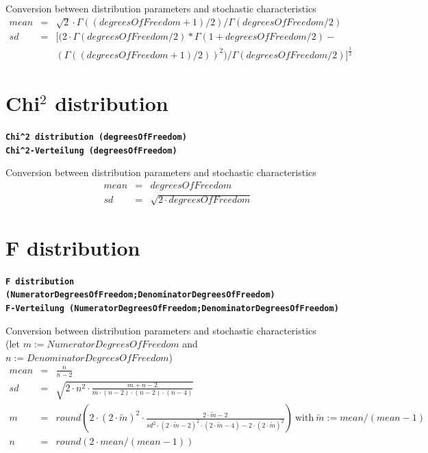 \documentclass{svmono}
\def\cm#1{\textbf{\texttt{#1}}}
\begin{document}
Conversion between distribution parameters and stochastic characteristics
\begin{eqnarray*}
mean&=&\sqrt{2}\cdot\Gamma((degreesOfFreedom+1)/2)/\Gamma(degreesOfFreedom/2)\\
sd&=&\Big[(2\cdot\Gamma(degreesOfFreedom/2)*\Gamma(1+degreesOfFreedom/2)-\\
~&~&(\Gamma((degreesOfFreedom+1)/2))^2)/\Gamma(degreesOfFreedom/2)\Big]^{\frac{1}{2}}
\end{eqnarray*}





\section*{Chi$^2$ distribution}
\cm{Chi\^{}2 distribution (degreesOfFreedom)}~\\
\cm{Chi\^{}2-Verteilung (degreesOfFreedom)}

Conversion between distribution parameters and stochastic characteristics
\begin{eqnarray*}
mean&=&degreesOfFreedom\\
sd&=&\sqrt{2\cdot degreesOfFreedom}
\end{eqnarray*}





\section*{F distribution}
\cm{F distribution (NumeratorDegreesOfFreedom;DenominatorDegreesOfFreedom)}~\\
\cm{F-Verteilung (NumeratorDegreesOfFreedom;DenominatorDegreesOfFreedom)}

Conversion between distribution parameters and stochastic characteristics\\
(let $m:=NumeratorDegreesOfFreedom$ and $n:=DenominatorDegreesOfFreedom$)
\begin{eqnarray*}
mean&=&
\frac{n}{n-2}\\
sd&=&
\sqrt{2\cdot n^2\cdot\frac{m+n-2}{m\cdot(n-2)\cdot(n-2)\cdot(n-4)}}\\
m&=&
round\left(2\cdot (2\cdot\widetilde m)^2\cdot\frac{2\cdot\widetilde m-2}{sd^2\cdot (2\cdot\widetilde m-2)^2\cdot (2\cdot\widetilde m-4)-2\cdot (2\cdot\widetilde m)^2}\right) ~\text{with}~ \widetilde m:=mean/(mean-1)\\
n&=&
round(2\cdot mean/(mean-1))
\end{eqnarray*}
\end{document}
